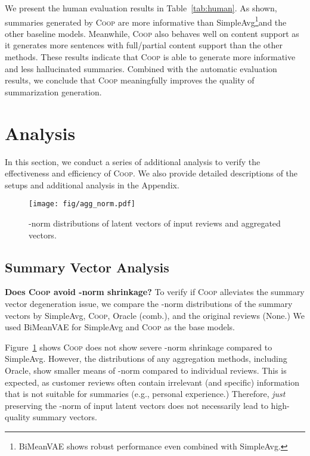 \documentclass[11pt]{article}
\newcommand{\aggname}{\textsc{Coop}}
\newcommand{\name}{\mbox{\sc BiMeanVAE}}
\newcommand{\simpleavg}{\mbox{SimpleAvg}}
\newcommand{\hl}[1]{#1}
\begin{document}
We present the human evaluation results in Table~\ref{tab:human}. As shown, summaries generated by \aggname{} are more informative than \simpleavg{}\footnote{\name{} shows robust performance even combined with \simpleavg. 
}and the other baseline models. Meanwhile, \aggname{} also behaves well on content support 
as it generates more sentences with full/partial content support than the other methods.
These results indicate that \aggname{} is able to generate more informative and less hallucinated summaries.
Combined with the automatic evaluation results, we conclude that \aggname{} meaningfully improves the quality of summarization generation.

\section{Analysis}\label{sec:exp:analysis}
\hl{In this section, we conduct a series of additional analysis to verify the effectiveness and efficiency of \aggname{}. We also provide detailed descriptions of the setups and additional analysis in the Appendix.}

\begin{figure}[t]
    \centering
    \texttt{[image: fig/agg\_norm.pdf]}
    \caption{\hl{-norm} distributions of latent vectors of input reviews and aggregated vectors.} \label{fig:agg_norm}
\end{figure}

\subsection{Summary Vector Analysis}
\label{sub:summary_vec_analysis}
\noindent
{\bf Does \aggname{} avoid -norm shrinkage?}
To verify if \aggname{} alleviates the summary vector degeneration issue, we compare the -norm distributions of the summary vectors by \simpleavg{}, \aggname{}, Oracle (comb.), and the original reviews (None.) We used \name{} for \simpleavg{} and \aggname{} as the base models.

Figure~\ref{fig:agg_norm} shows \aggname{} does not show severe -norm shrinkage compared to \simpleavg{}.
However, the distributions of any aggregation methods, including Oracle, show smaller means of -norm compared to individual reviews. This is expected, as customer reviews often contain irrelevant (and specific) information that is not suitable for summaries (e.g., personal experience.)
Therefore, {\em just} preserving the -norm of input latent vectors does not necessarily lead to high-quality summary vectors. 
\end{document}
